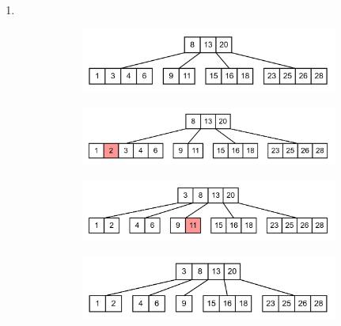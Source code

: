 \documentclass[11pt,a4paper]{article}
\begin{document}
\begin{loesung}
\begin{enumerate}
        \newpage
        \item \ \\
        \begin{figure}[h!]
            \centering
            \begin{subfigure}[b]{0.45\textwidth}
                \centering
                \includegraphics[width=\textwidth]{img/3c/1}
            \end{subfigure}
            \begin{subfigure}[b]{0.45\textwidth}
                \centering
                \includegraphics[width=\textwidth]{img/3c/2}
            \end{subfigure}
            \begin{subfigure}[b]{0.45\textwidth}
                \centering
                \includegraphics[width=\textwidth]{img/3c/3}
            \end{subfigure}
            \begin{subfigure}[b]{0.45\textwidth}
                \centering
                \includegraphics[width=\textwidth]{img/3c/3a}
            \end{subfigure}

\end{figure}
\end{enumerate}
\end{loesung}
\end{document}
